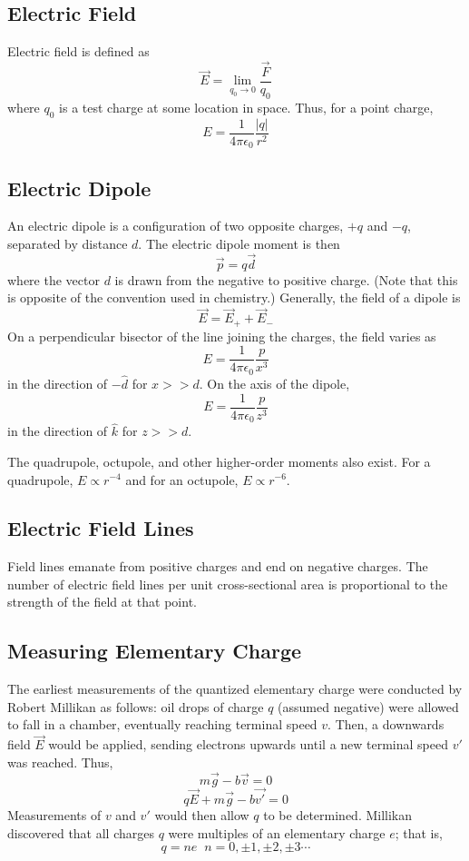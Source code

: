 \documentclass[../PhysicsFormulae.tex]{subfiles}
\begin{document}
\subsection{Electric Field}
Electric field is defined as 
\[ \vec{E} = \lim_{q_0 \to 0}\frac{\vec{F}}{q_0} \]
where $q_0$ is a test charge at some location in space. Thus, for a point charge, 
\[ E = \frac{1}{4\pi \epsilon_0} \frac{|q|}{r^2} \]

\subsection{Electric Dipole}
An electric dipole is a configuration of two opposite charges, $+q$ and $-q$, separated by distance $d$. The electric dipole moment is then
\[ \vec{p} = q\vec{d} \]
where the vector $d$ is drawn from the negative to positive charge. (Note that this is opposite of the convention used in chemistry.) Generally, the field of a dipole is 
\[ \vec{E} = \vec{E}_+ + \vec{E}_- \]
On a perpendicular bisector of the line joining the charges, the field varies as
\[ E = \frac{1}{4\pi \epsilon_0} \frac{p}{x^3} \]
in the direction of $-\hat{d}$ for $x>>d$.
On the axis of the dipole, 
\[ E = \frac{1}{4\pi \epsilon_0} \frac{p}{z^3} \]
in the direction of $\hat{k}$ for $z>>d$. \bigskip 

The quadrupole, octupole, and other higher-order moments also exist. For a quadrupole, $E \propto r^{-4}$ and for an octupole, $E \propto r^{-6}$.

\subsection{Electric Field Lines}
Field lines emanate from positive charges and end on negative charges. The number of electric field lines per unit cross-sectional area is proportional to the strength of the field at that point. 

\subsection{Measuring Elementary Charge}
The earliest measurements of the quantized elementary charge were conducted by Robert Millikan as follows: oil drops of charge $q$ (assumed negative) were allowed to fall in a chamber, eventually reaching terminal speed $v$. Then, a downwards field $\vec{E}$ would be applied, sending electrons upwards until a new terminal speed $v'$ was reached. Thus, 
\[ m\vec{g} - b\vec{v} = 0 \]
\[ q\vec{E} + m\vec{g} - b\vec{v'} = 0 \]
Measurements of $v$ and $v'$ would then allow $q$ to be determined. Millikan discovered that all charges $q$ were multiples of an elementary charge $e$; that is, 
\[ q = ne \; \; n=0, \pm1, \pm2, \pm3 \cdots \]
\end{document}
